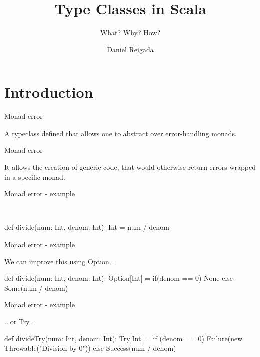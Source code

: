 \documentclass[13pt]{beamer}
\title{Type Classes in Scala}
\subtitle{What? Why? How?}
\author{Daniel Reigada}
\institute{IST - Programming Languages}
\begin{document}
\maketitle

\section{Introduction}

\begin{frame}{Monad error}

  A typeclass defined that allows one to abstract over error-handling monads. \\


\end{frame}

\begin{frame}{Monad error}

  It allows the creation of generic code, that would otherwise return errors wrapped in a specific monad. \\

\end{frame}

\begin{frame}[fragile]{Monad error - example}
  
   \\ 

  \begin{scalaCode}
    def divide(num: Int, denom: Int): Int = num / denom
  \end{scalaCode}

\end{frame}

\begin{frame}[fragile]{Monad error - example}

  We can improve this using Option...

  \begin{scalaCode}
    def divide(num: Int, denom: Int): Option[Int] =
      if(denom == 0) None else Some(num / denom)
  \end{scalaCode}

\end{frame}

\begin{frame}[fragile]{Monad error - example}

  ...or Try...

  \begin{scalaCode}
    def divideTry(num: Int, denom: Int): Try[Int] =
      if (denom == 0) Failure(new Throwable("Division by 0"))
      else Success(num / denom)
  \end{scalaCode}

\end{frame}
\end{document}
